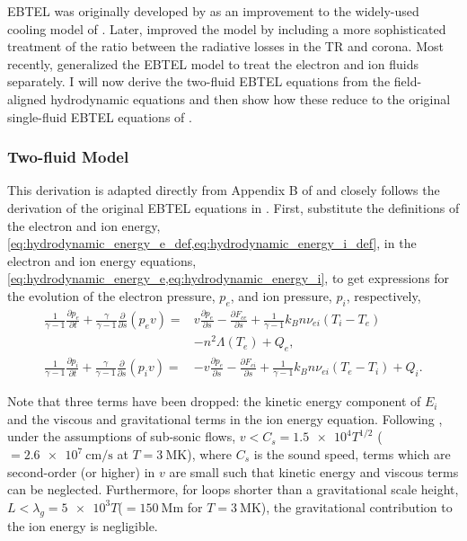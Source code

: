 EBTEL was originally developed by \citet{klimchuk_highly_2008} as an improvement to the widely-used cooling model of \citet{cargill_implications_1994}. Later, \citet{cargill_enthalpy-based_2012} improved the model by including a more sophisticated treatment of the ratio between the radiative losses in the TR and corona. Most recently, \citet{barnes_inference_2016} generalized the EBTEL model to treat the electron and ion fluids separately. I will now derive the two-fluid EBTEL equations from the field-aligned hydrodynamic equations and then show how these reduce to the original single-fluid EBTEL equations of \citet{klimchuk_highly_2008,cargill_enthalpy-based_2012}.

\subsubsection{Two-fluid Model}\label{sec:ebtel-two-fluid}

This derivation is adapted directly from Appendix B of \citet[\autoref{ch:inferring_hot_plasma} of this thesis]{barnes_inference_2016} and closely follows the derivation of the original EBTEL equations in \citet{klimchuk_highly_2008,cargill_enthalpy-based_2012}. First, substitute the definitions of the electron and ion energy, \cref{eq:hydrodynamic_energy_e_def,eq:hydrodynamic_energy_i_def}, in the electron and ion energy equations, \cref{eq:hydrodynamic_energy_e,eq:hydrodynamic_energy_i}, to get expressions for the evolution of the electron pressure, $p_e$, and ion pressure, $p_i$, respectively,
\begin{align}
    \frac{1}{\gamma - 1}\frac{\partial p_e}{\partial t} + \frac{\gamma}{\gamma - 1}\frac{\partial}{\partial s}(p_ev) =& v\frac{\partial p_e}{\partial s} - \frac{\partial F_{ce}}{\partial s} + \frac{1}{\gamma - 1}k_Bn\nu_{ei}(T_i-T_e) \label{eq:1denergy_e_simp} \\
    &- n^2\Lambda(T_e) + Q_{e}, \nonumber \\
    \frac{1}{\gamma - 1}\frac{\partial p_i}{\partial t} + \frac{\gamma}{\gamma - 1}\frac{\partial }{\partial s}(p_iv) =& -v\frac{\partial p_e}{\partial s} - \frac{\partial F_{ci}}{\partial s} + \frac{1}{\gamma - 1}k_Bn\nu_{ei}(T_e-T_i) + Q_{i}. \label{eq:1denergy_i_simp}
\end{align}

Note that three terms have been dropped: the kinetic energy component of $E_i$ and the viscous and gravitational terms in the ion energy equation. Following \citet{klimchuk_highly_2008}, under the assumptions of sub-sonic flows, $v<C_s=\num{1.5e4}T^{1/2}$ ($=\SI{2.6e7}{\cm\per\second}$ at $T=\SI{3}{\mega\kelvin}$), where $C_s$ is the sound speed, terms which are second-order (or higher) in $v$ are small such that kinetic energy and viscous terms can be neglected. Furthermore, for loops shorter than a gravitational scale height, $L<\lambda_g=\num{5e3}T$($=\SI{150}{\mega\m}$ for $T=\SI{3}{\mega\kelvin}$), the gravitational contribution to the ion energy is negligible.

